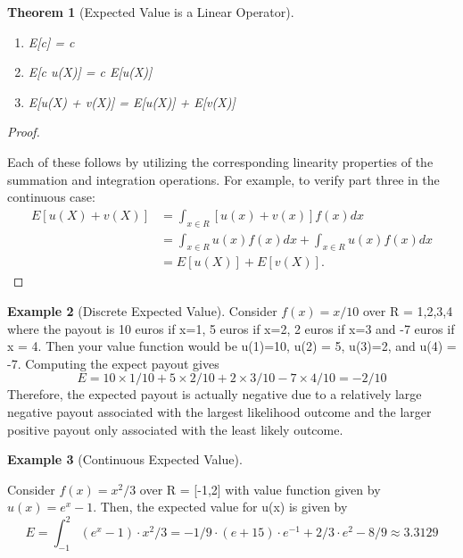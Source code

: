 \documentclass[10pt,]{book}
\theoremstyle{plain}
\newtheorem{theorem}{Theorem}[section]
\theoremstyle{definition}
\theoremstyle{definition}
\newtheorem{example}[theorem]{Example}
\theoremstyle{definition}
\numberwithin{equation}{section}
\begin{document}
\begin{theorem}[{Expected Value is a Linear Operator}]\label{theorem-26}

	\leavevmode%
\begin{enumerate}
\item\hypertarget{li-156}{}E[c] = c%
\item\hypertarget{li-157}{}E[c u(X)] = c E[u(X)]%
\item\hypertarget{li-158}{}E[u(X) + v(X)] = E[u(X)] + E[v(X)]%
\end{enumerate}

\end{theorem}
\begin{proof}\hypertarget{proof-28}{}
Each of these follows by utilizing the corresponding linearity properties of the summation and integration operations. For example, to verify part three in the continuous case:
	\begin{align*}
E[u(X) + v(X)] & = \int_{x \in R} [u(x)+v(x)]f(x) dx\\
 & = \int_{x \in R} u(x)f(x) dx + \int_{x \in R} u(x)f(x) dx\\
 & = E[u(X)] + E[v(X)].
\end{align*}
\end{proof}
\begin{example}[Discrete Expected Value]\label{example-17}
Consider \(f(x) = x/10\) over R = {1,2,3,4} where the payout is 10 euros if x=1, 5 euros if x=2, 2 euros if x=3 and -7 euros if x = 4.  Then your value function would be u(1)=10, u(2) = 5, u(3)=2, and u(4) = -7. Computing the expect payout gives
	\begin{equation*}E = 10 \times 1/10 + 5 \times 2/10 + 2 \times 3/10 - 7 \times 4/10 = -2/10\end{equation*}
	Therefore, the expected payout is actually negative due to a relatively large negative payout associated with the largest likelihood outcome and the larger positive payout only associated with the least likely outcome.
\end{example}
\begin{example}[Continuous Expected Value]\label{example-18}

	Consider \(f(x) = x^2/3\) over R = [-1,2] with value function given by \(u(x) = e^x - 1\). Then, the expected value for u(x) is given by
	\begin{equation*}E = \int_{-1}^2 (e^x-1) \cdot x^2/3 = -1/9 \cdot (e + 15) \cdot e^{-1} + 2/3 \cdot e^2 - 8/9 \approx 3.3129\end{equation*}
\end{example}
\end{document}
